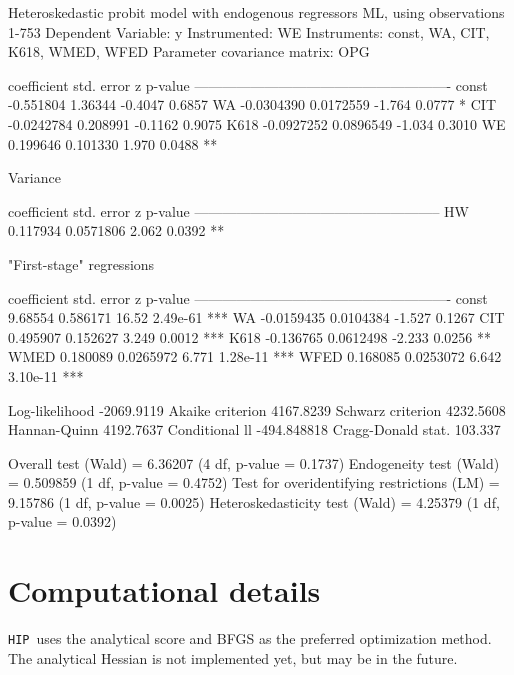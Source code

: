 \documentclass[a4paper,10pt]{article}
\newcommand{\HIP}{\texttt{HIP}}
\begin{document}
\begin{code}
Heteroskedastic probit model with endogenous regressors
ML, using observations 1-753
Dependent Variable: y 
Instrumented: WE
Instruments: const, WA, CIT, K618, WMED, WFED 
Parameter covariance matrix: OPG

             coefficient   std. error      z      p-value
  -------------------------------------------------------
  const      -0.551804     1.36344      -0.4047   0.6857 
  WA         -0.0304390    0.0172559    -1.764    0.0777  *
  CIT        -0.0242784    0.208991     -0.1162   0.9075 
  K618       -0.0927252    0.0896549    -1.034    0.3010 
  WE          0.199646     0.101330      1.970    0.0488  **

Variance 

             coefficient   std. error     z     p-value
  -----------------------------------------------------
  HW          0.117934     0.0571806    2.062   0.0392  **

"First-stage" regressions

             coefficient   std. error     z      p-value 
  -------------------------------------------------------
  const       9.68554      0.586171     16.52    2.49e-61 ***
  WA         -0.0159435    0.0104384    -1.527   0.1267  
  CIT         0.495907     0.152627      3.249   0.0012   ***
  K618       -0.136765     0.0612498    -2.233   0.0256   **
  WMED        0.180089     0.0265972     6.771   1.28e-11 ***
  WFED        0.168085     0.0253072     6.642   3.10e-11 ***

Log-likelihood       -2069.9119  Akaike criterion    4167.8239
Schwarz criterion     4232.5608  Hannan-Quinn        4192.7637
Conditional ll      -494.848818  Cragg-Donald stat.    103.337

Overall test (Wald) = 6.36207 (4 df, p-value = 0.1737)
Endogeneity test (Wald) = 0.509859 (1 df, p-value = 0.4752)
Test for overidentifying restrictions (LM) = 9.15786 (1 df, p-value = 0.0025)
Heteroskedasticity test (Wald) = 4.25379 (1 df, p-value = 0.0392)
\end{code}

\section{Computational details}

\HIP\ uses the analytical score and BFGS as the preferred optimization
method. The analytical Hessian is not implemented yet, but may be in
the future.
\end{document}
